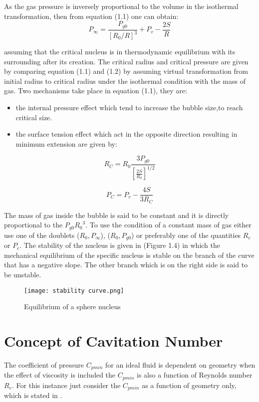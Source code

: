 As the gas pressure is inversely proportional to the volume in the
isothermal transformation, then from equation (1.1) one can obtain:
\begin{equation}
P_{\infty} =\frac{P_{g0}}{{[{R_0}/{R}]}^{3}} +P_v -\frac{2S}{R}
\end{equation}

assuming that the critical nucleus is in thermodynamic equilibrium
with its surrounding after its creation. The critical radius and
critical pressure are given by comparing equation (1.1) and (1.2) by
assuming virtual transformation from initial radius to critical radius
under the isothermal condition with the mass of gas. Two mechanisms
take place in equation (1.1), they are:

\begin{itemize}
  \item the internal pressure effect which tend to increase the bubble
    size,to reach critical size.
  \item the surface tension effect which act in the opposite direction
    resulting in  minimum extension are given by:
\end{itemize}

\begin{equation}
R_C = R_0 \frac {3P_{g0}}{[{\frac{2S}{R_0}}]^{1/2}}
\end{equation}
  
\begin{equation}
  P_C = P_v -{\frac{4S}{3R_C}}
\end{equation}

The mass of gas inside the bubble is said to be constant and it is directly proportional
to the $P_{g0}{{R_0}^3}$. To use the condition of a constant mass of
gas either use one of the doublets ($R_0 ,P_{\infty}$), ($R_0,P_{g0}$)
or preferably one of the quantities $R_c$ or $P_c $. The stability of the
nucleus is given in (Figure 1.4) in which the mechanical equilibrium of
the specific nucleus is stable on the branch of the curve that has a
negative slope. The other branch which is on the right side is said to
be unstable.\\

\begin{figure}[H]
  \centering
  \texttt{[image: stability curve.png]}
  \caption{Equilibrium of a sphere nucleus \cite{FundamentalsofCavitation.2004}}
  \label{fig:fig4}
\end{figure}

\section{Concept of Cavitation Number}
The coefficient of pressure $C_{pmin}$ for an ideal fluid is dependent
on geometry when the effect of viscosity is included the $C_{pmin}$ is
also a function of Reynolds number $R_e$. For this instance just
consider  the $C_{pmin}$ as a function of geometry only, which is stated in \cite{CavitationandBubbleDynamics.1995}.
    
